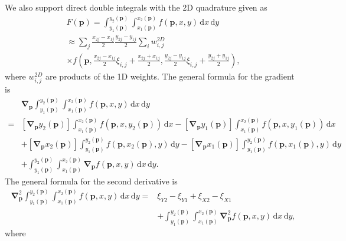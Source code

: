 \documentclass{article}
\newcommand{\D}{\,\textrm{d}}
\begin{document}
We also support direct double integrals with the 2D quadrature given as
\begin{multline}
  F(\bm p) = \int_{y_1(\bm p)}^{y_2(\bm p)}\int_{x_1(\bm p)}^{x_2(\bm p)} f(\bm p, x, y) \D x \D y \\
  \approx \sum_j \frac{x_{2j}-x_{1j}}{2}\frac{y_{2j}-y_{1j}}{2} \sum_i w_{i,j}^{2D} \\
  \times f \left( \bm p, \frac{x_{2j}-x_{1j}}{2}\xi_{i,j} + \frac{x_{2j}+x_{1j}}{2}, \frac{y_{2j}-y_{1j}}{2}\xi_{i,j} + \frac{y_{2j}+y_{1j}}{2} \right),
\end{multline}
where $w_{i,j}^{2D}$ are products of the 1D weights. The general formula for the gradient is
\begin{equation}
  \begin{split}
    & \bm\nabla_{\bm p} \int_{y_1(\bm p)}^{y_2(\bm p)}\int_{x_1(\bm p)}^{x_2(\bm p)} f(\bm p, x, y) \,\mathrm{d}x\,\mathrm{d}y \\
    =& \left[ \bm\nabla_{\bm p} y_2(\bm p) \right] \int_{x_1(\bm p)}^{x_2(\bm p)} f(\bm p, x, y_2(\bm p)) \,\mathrm{d}x -
    \left[ \bm\nabla_{\bm p} y_1(\bm p) \right] \int_{x_1(\bm p)}^{x_2(\bm p)} f(\bm p, x, y_1(\bm p)) \,\mathrm{d}x \\
    &+ \left[ \bm\nabla_{\bm p} x_2(\bm p) \right] \int_{y_1(\bm p)}^{y_2(\bm p)} f(\bm p, x_2(\bm p), y) \,\mathrm{d}y -
    \left[ \bm\nabla_{\bm p} x_1(\bm p) \right] \int_{y_1(\bm p)}^{y_2(\bm p)} f(\bm p, x_1(\bm p), y) \,\mathrm{d}y \\
    &+ \int_{y_1(\bm p)}^{y_2(\bm p)} \int_{x_1(\bm p)}^{x_2(\bm p)} \bm\nabla_{\bm p} f(\bm p, x, y) \,\mathrm{d}x\,\mathrm{d}y.
  \end{split}
\end{equation}
The general formula for the second derivative is
\begin{equation}
  \begin{split}
    \bm\nabla_{\bm p}^2 \int_{y_1(\bm p)}^{y_2(\bm p)}\int_{x_1(\bm p)}^{x_2(\bm p)} f(\bm p, x, y) \,\mathrm{d}x\,\mathrm{d}y =& \xi_{Y2} - \xi_{Y1} + \xi_{X2} - \xi_{X1} \\
    & + \int_{y_1(\bm p)}^{y_2(\bm p)} \int_{x_1(\bm p)}^{x_2(\bm p)} \bm\nabla_{\bm p}^2 f(\bm p, x, y) \,\mathrm{d}x\,\mathrm{d}y,
  \end{split}
\end{equation}
where
\end{document}
